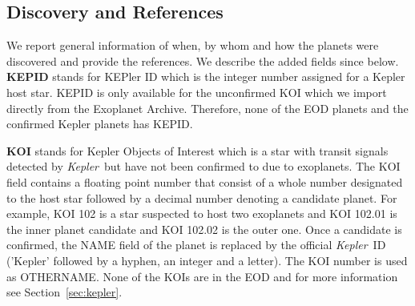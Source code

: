 \documentclass[11pt,preprint]{aastex}
\def\kepler{\textit{Kepler}}
\begin{document}
\begin{CJK*}{UTF8}{gbsn}
\subsection{Discovery and References}

We report general information of when, by whom and how the planets were
discovered and provide the references. We describe the added fields since \cite{Wright2011} below. \\

{\bf KEPID} stands for KEPler ID which is the integer number assigned for a Kepler host star. KEPID is only available for the unconfirmed KOI which we import directly from the Exoplanet Archive. Therefore, none of the EOD planets and the confirmed Kepler planets has KEPID.


{\bf KOI} stands for Kepler Objects of Interest which is a star with transit signals detected by \kepler\ but have not been confirmed to due to exoplanets. The KOI field contains a floating point number that consist of a whole number designated to the host star followed by a decimal number denoting a candidate planet. For example, KOI 102 is a star suspected to host two exoplanets and KOI 102.01 is the inner planet candidate and KOI 102.02 is the outer one. Once a candidate is confirmed, the NAME field of the planet is replaced by the official \kepler\ ID ('Kepler' followed by a hyphen, an integer and a letter). The KOI number is used as OTHERNAME. None of the KOIs are in the EOD and for more information see Section~\ref{sec:kepler}. 

\begin{comment}
\textit {Sharon: you need to say what KOI stores. When writing each
  field, keep in mind you need to cover the following so that the
  reader will completely understand: (1) what the field stands for
  (e.g., in case of an abbreviation like KOI); (2) what the field
  physically means, like `KOI' means planet candidates that have transit
  signals as detected by \kepler\ but have not been confirmed, and
  make sure to be thorough at what you say -- sometimes things are not
  that obvious to an outsider reader, e.g., think if a cosmologist
  would understand what you're saying when reading it; (3) what the
  field actually contains, e.g. KOI contains the KOI number designated
  by the \kepler\ team (right?), it is a floating point number, and
  sometimes maybe even worth giving an example, e.g. KOI 30.1 or
  something...; (4) why we added this new field, if this information
  is helpful, or if it's a revised field since \cite{Wright2011}, what
  is changed. Also, use \kepler\ (which is a defined symbol in our ms.tex file),
  instead of typing out Kepler, since you need italic.
  Don't be afraid to write more! Being concise is important, but it's
  always easier to trim down things than to add things on, especially
  for a documentation type of paper like this. Let's be thorough at
  first, then try to reach optimal conciseness.}
 \end{comment}


\end{CJK*}
\end{document}
